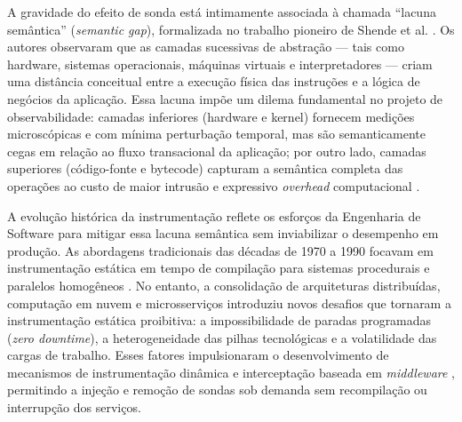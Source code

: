 \documentclass[sigconf, anonymous]{acmart}
\begin{document}
A gravidade do efeito de sonda está intimamente associada à chamada ``lacuna semântica'' (\textit{semantic gap}), formalizada no trabalho pioneiro de Shende et al. \cite{shende_2001}. Os autores observaram que as camadas sucessivas de abstração — tais como hardware, sistemas operacionais, máquinas virtuais e interpretadores — criam uma distância conceitual entre a execução física das instruções e a lógica de negócios da aplicação. Essa lacuna impõe um dilema fundamental no projeto de observabilidade: camadas inferiores (hardware e kernel) fornecem medições microscópicas e com mínima perturbação temporal, mas são semanticamente cegas em relação ao fluxo transacional da aplicação; por outro lado, camadas superiores (código-fonte e bytecode) capturam a semântica completa das operações ao custo de maior intrusão e expressivo \textit{overhead} computacional \cite{shende_2001, debes_application}.

A evolução histórica da instrumentação reflete os esforços da Engenharia de Software para mitigar essa lacuna semântica sem inviabilizar o desempenho em produção. As abordagens tradicionais das décadas de 1970 a 1990 focavam em instrumentação estática em tempo de compilação para sistemas procedurais e paralelos homogêneos \cite{sivasubramaniam_1994}. No entanto, a consolidação de arquiteturas distribuídas, computação em nuvem e microsserviços introduziu novos desafios que tornaram a instrumentação estática proibitiva: a impossibilidade de paradas programadas (\textit{zero downtime}), a heterogeneidade das pilhas tecnológicas e a volatilidade das cargas de trabalho. Esses fatores impulsionaram o desenvolvimento de mecanismos de instrumentação dinâmica e interceptação baseada em \textit{middleware} \cite{reilly_2006}, permitindo a injeção e remoção de sondas sob demanda sem recompilação ou interrupção dos serviços.
\end{document}
